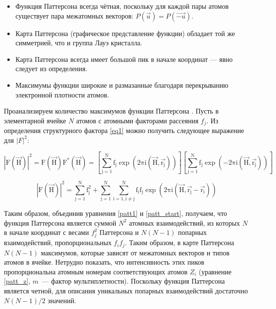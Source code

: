 \begin{itemize}
	\item Функция Паттерсона всегда чётная, поскольку для каждой пары атомов существует пара межатомных векторов: $P(\overrightarrow{u}) = P(\overrightarrow{-u})$.
	\item Карта Паттерсона (графическое представление функции) обладает той же симметрией, что и группа Лауэ кристалла.
	\item Карта Паттерсона всегда имеет большой пик в начале координат --- явно следует из определения.
	\item Максимумы функции широкие и размазанные благодаря перекрыванию электронной плотности атомов.
\end{itemize}

Проанализируем количество максимумов функции Паттерсона \cite{rossmann_patterson_2001}. Пусть в элементарной ячейке $N$ атомов с атомными факторами рассеяния $f_j$. Из определения структурного фактора \ref{eq1} можно получить следующее выражение для $|F|^2$:

\begin{equation}
	\mathrm{|F(\overrightarrow{H})|^2 = F(\overrightarrow{H})F^*(\overrightarrow{H}) = \left[\sum\limits_{j=1}^N f_j \exp(2\pi i (\overrightarrow{H}, \overrightarrow{r_j}))\right]\left[\sum\limits_{j=1}^N f_j \exp(-2\pi i (\overrightarrow{H}, \overrightarrow{r_j}))\right]}
\end{equation}

\begin{equation}\label{patt1}
	\mathrm{|F(\overrightarrow{H})|^2 = \sum\limits_{j=1}^N f_j^2 + \sum\limits_{j=1}^N\sum\limits_{i=1, i\neq j}^N f_if_j\exp(2\pi i (\overrightarrow{H}, \overrightarrow{r_j}-\overrightarrow{r_i}))}
\end{equation}

Таким образом, объединив уравнения \ref{patt1} и \ref{patt_start}, получаем, что функция Паттерсона является суммой $N^2$ атомных взаимодействий, из которых $N$ в начале координат с весами $f_j^2$ Паттерсона и $N(N-1)$ попарных взаимодействий, пропорциональных $f_if_j$. Таким образом, в карте Паттерсона $N(N-1)$ максимумов, которые зависят от межатомных векторов и типов атомов в ячейке. Нетрудно показать, что интенсивность этих пиков пропорциональна атомным номерам соответствующих атомов $Z_i$ (уравнение \ref{patt_z}, $m$~--- фактор мультиплетности). Поскольку функция Паттерсона является четной, для описания уникальных попарных взаимодействий достаточно $N(N-1)/2$ значений. 

